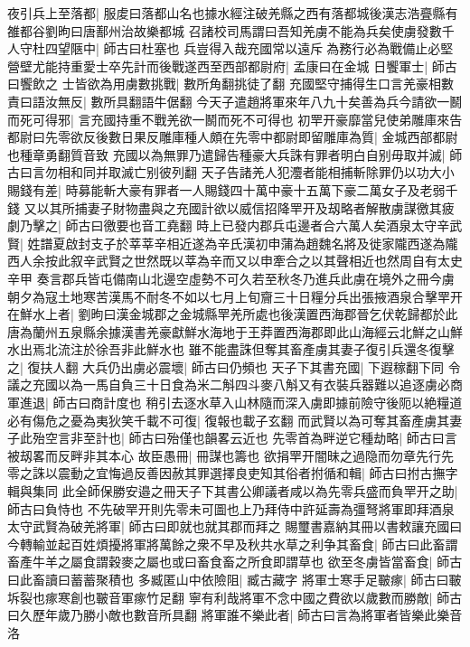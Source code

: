 夜引兵上至落都|{
	服䖍曰落都山名也據水經注破羌縣之西有落都城後漢志浩亹縣有雒都谷劉昫曰唐鄯州治故樂都城}
召諸校司馬謂曰吾知羌虜不能為兵矣使虜發數千人守杜四望陿中|{
	師古曰杜塞也}
兵豈得入哉充國常以遠斥為務行必為戰備止必堅營壁尤能持重愛士卒先計而後戰遂西至西部都尉府|{
	孟康曰在金城}
日饗軍士|{
	師古曰饗飲之}
士皆欲為用虜數挑戰|{
	數所角翻挑徒了翻}
充國堅守捕得生口言羌豪相數責曰語汝無反|{
	數所具翻語牛倨翻}
今天子遣趙將軍來年八九十矣善為兵今請欲一鬭而死可得邪|{
	言充國持重不戰羌欲一鬭而死不可得也}
初䍐开豪靡當兒使弟雕庫來告都尉曰先零欲反後數日果反雕庫種人頗在先零中都尉即留雕庫為質|{
	金城西部都尉也種章勇翻質音致}
充國以為無罪乃遣歸告種豪大兵誅有罪者明白自别毋取并滅|{
	師古曰言勿相和同并取滅亡别彼列翻}
天子告諸羌人犯灋者能相捕斬除罪仍以功大小賜錢有差|{
	時募能斬大豪有罪者一人賜錢四十萬中豪十五萬下豪二萬女子及老弱千錢}
又以其所捕妻子財物盡與之充國計欲以威信招降䍐开及刼略者解散虜謀徼其疲劇乃擊之|{
	師古曰徼要也音工堯翻}
時上已發内郡兵屯邊者合六萬人矣酒泉太守辛武賢|{
	姓譜夏啟封支子於莘莘辛相近遂為辛氏漢初申蒲為趙魏名將及徙家隴西遂為隴西人余按此叙辛武賢之世然既以莘為辛而又以申牽合之以其聲相近也然周自有太史辛甲}
奏言郡兵皆屯備南山北邊空虛勢不可久若至秋冬乃進兵此虜在境外之冊今虜朝夕為寇土地寒苦漢馬不耐冬不如以七月上旬齎三十日糧分兵出張掖酒泉合擊䍐开在鮮水上者|{
	劉昫曰漢金城郡之金城縣䍐羌所處也後漢置西海郡晉乞伏乾歸都於此唐為蘭州五泉縣余據漢書羌豪獻鮮水海地于王莽置西海郡即此山海經云北鮮之山鮮水出焉北流注於徐吾非此鮮水也}
雖不能盡誅但奪其畜產虜其妻子復引兵還冬復擊之|{
	復扶人翻}
大兵仍出虜必震壞|{
	師古曰仍頻也}
天子下其書充國|{
	下遐稼翻下同}
令議之充國以為一馬自負三十日食為米二斛四斗麥八斛又有衣裝兵器難以追逐虜必商軍進退|{
	師古曰商計度也}
稍引去逐水草入山林隨而深入虜即據前險守後阨以絶糧道必有傷危之憂為夷狄笑千載不可復|{
	復報也載子玄翻}
而武賢以為可奪其畜產虜其妻子此殆空言非至計也|{
	師古曰殆僅也韻畧云近也}
先零首為畔逆它種劫略|{
	師古曰言被刼畧而反畔非其本心}
故臣愚冊|{
	冊謀也籌也}
欲捐䍐开闇昧之過隐而勿章先行先零之誅以震動之宜悔過反善因赦其罪選擇良吏知其俗者拊循和輯|{
	師古曰拊古撫字輯與集同}
此全師保勝安邉之冊天子下其書公卿議者咸以為先零兵盛而負䍐开之助|{
	師古曰負恃也}
不先破䍐开則先零未可圖也上乃拜侍中許延壽為彊弩將軍即拜酒泉太守武賢為破羌將軍|{
	師古曰即就也就其郡而拜之}
賜璽書嘉納其冊以書敕讓充國曰今轉輸並起百姓煩擾將軍將萬餘之衆不早及秋共水草之利争其畜食|{
	師古曰此畜謂畜產牛羊之屬食謂穀麥之屬也或曰畜食畜之所食即謂草也}
欲至冬虜皆當畜食|{
	師古曰此畜讀曰蓄蓄聚積也}
多臧匿山中依險阻|{
	臧古藏字}
將軍士寒手足皸瘃|{
	師古曰皸坼裂也瘃寒創也皸音軍瘃竹足翻}
寧有利哉將軍不念中國之費欲以歲數而勝敵|{
	師古曰久歷年歲乃勝小敵也數音所具翻}
將軍誰不樂此者|{
	師古曰言為將軍者皆樂此樂音洛}

